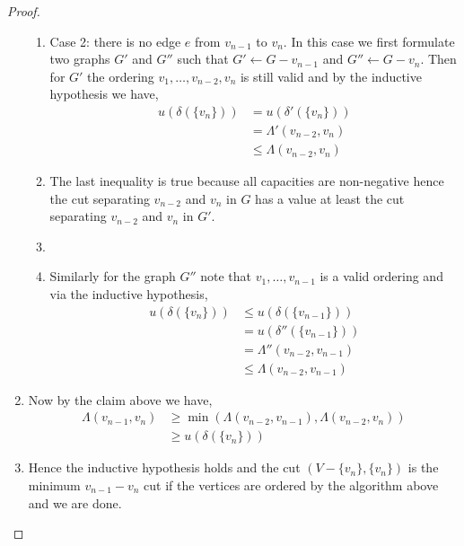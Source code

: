\documentclass{article}
\numberwithin{equation}{section}
\begin{document}
\begin{proof}
\begin{enumerate}
\begin{enumerate}
                    \item Case 2: there is no edge $e$ from $v_{n-1}$ to $v_n$. In this case we first formulate two graphs $G'$ and $G''$ such that $G' \leftarrow G - v_{n-1}$ and $G''\leftarrow G - v_n$. Then for $G'$ the ordering $v_1, \dots, v_{n-2}, v_n$ is still valid and by the inductive hypothesis we have, 
                    \begin{equation}
                        \begin{split}
                            u(\delta(\{v_n\})) &= u(\delta'(\{v_n\}))\\
                        &= \Lambda'(v_{n-2}, v_n)\\
                        &\le \Lambda(v_{n-2}, v_n)
                        \end{split}
                    \end{equation}
                    \item[] The last inequality is true because all capacities are non-negative hence the cut separating $v_{n-2}$ and $v_n$ in $G$ has a value at least the cut separating $v_{n-2}$ and $v_n$  in $G'$. 
                    \item[] 
                    \item[] Similarly for the graph $G''$ note that $v_1, \dots, v_{n-1}$ is a valid ordering and via the inductive hypothesis, 
                    \begin{equation}
                        \begin{split}
                            u(\delta(\{v_n\})) &\le u(\delta(\{v_{n-1}\}))\\
                            &=u(\delta''(\{v_{n-1}\}))\\
                            &= \Lambda''(v_{n-2}, v_{n-1})\\
                            &\le \Lambda(v_{n-2}, v_{n-1})
                        \end{split}
                    \end{equation}
                \end{enumerate}
            \item[] Now by the claim above we have, 
            \begin{equation}
                \begin{split}
                     \Lambda(v_{n-1}, v_{n}) &\ge \min(\Lambda(v_{n-2}, v_{n-1}), \Lambda(v_{n-2}, v_n))\\
                     &\ge u(\delta(\{v_{n}\}))
                \end{split}
            \end{equation}
            \item[] Hence the inductive hypothesis holds and the cut $(V-\{v_{n}\}, \{v_n\})$ is the minimum $v_{n-1}-v_n$ cut if the vertices are ordered by the algorithm above and we are done.   
    \end{enumerate}
    \end{proof}
\end{document}
